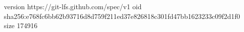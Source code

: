 version https://git-lfs.github.com/spec/v1
oid sha256:e768fc6bb62b93716d8d759f211ed37e826818c301fd47bb1623233c09f2d1f0
size 174916

